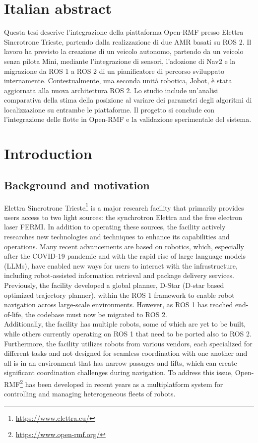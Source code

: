 \chapter*{Italian abstract}
Questa tesi descrive l'integrazione della piattaforma Open-RMF presso Elettra Sincrotrone Trieste, partendo dalla realizzazione di due AMR basati su ROS 2. Il lavoro ha previsto la creazione di un veicolo autonomo, partendo da un veicolo senza pilota Mini, mediante l'integrazione di sensori, l'adozione di Nav2 e la migrazione da ROS 1 a ROS 2 di un pianificatore di percorso sviluppato internamente. Contestualmente, una seconda unità robotica, Jobot, è stata aggiornata alla nuova architettura ROS 2. Lo studio include un'analisi comparativa della stima della posizione al variare dei parametri degli algoritmi di localizzazione su entrambe le piattaforme. Il progetto si conclude con l'integrazione delle flotte in Open-RMF e la validazione sperimentale del sistema.
\newpage
\chapter{Introduction}
\section{Background and motivation}
Elettra Sincrotrone Trieste\footnote{\href{https://www.elettra.eu/}{https://www.elettra.eu/}} is a major research facility that primarily provides users access to two light sources: the synchrotron Elettra and the free electron laser FERMI.
In addition to operating these sources, the facility actively researches new technologies and techniques to enhance its capabilities and operations. Many recent advancements are based on robotics, which, especially after the COVID-19 pandemic and with the rapid rise of large language models (LLMs), have enabled new ways for users to interact with the infrastructure, including robot-assisted information retrieval and package delivery services.
Previously, the facility developed a global planner, D-Star (D-star based optimized trajectory planner)\cite{10.1007/978-3-031-67295-8_33}, within the ROS 1 framework to enable robot navigation across large-scale environments.  However, as ROS 1 has reached end-of-life, the codebase must now be migrated to ROS 2.\\
Additionally, the facility has multiple robots, some of which are yet to be built, while others currently operating on ROS 1 that need to be ported also to ROS 2.
Furthermore, the facility utilizes robots from various vendors, each specialized for different tasks and not designed for seamless coordination with one another and all is in an environment that has narrow passages and lifts, which can create significant coordination challenges during navigation.
To address this issue,  Open-RMF\footnote{\href{https://www.open-rmf.org/}{https://www.open-rmf.org/}} has been developed in recent years as a multiplatform system for controlling and managing heterogeneous fleets of robots.
